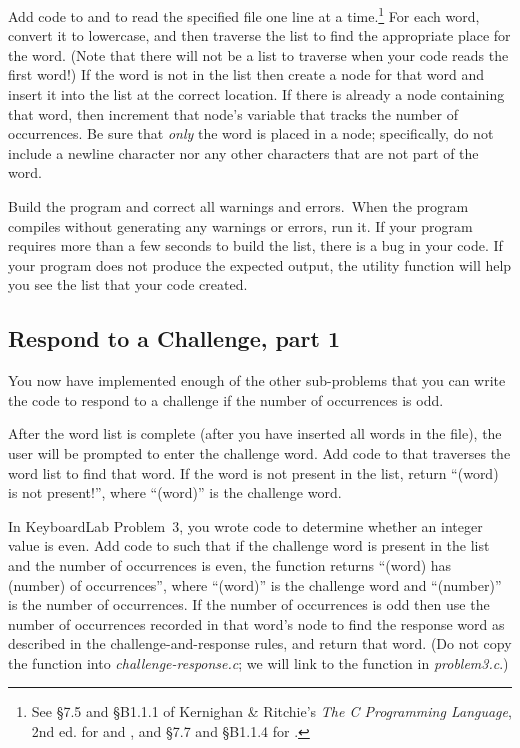 

Add code to  and  to read the specified file one line at a time.\footnote{See \S7.5 and \S{}B1.1.1 of Kernighan \& Ritchie's \textit{The C Programming Language}, 2nd ed. for  and , and \S7.7 and \S{}B1.1.4 for .} For each word, convert it to lowercase, and then traverse the list to find the appropriate place for the word.
(Note that there will not be a list to traverse when your code reads the first word!)
If the word is not in the list then create a node for that word and insert it into the list at the correct location.
If there is already a node containing that word, then increment that node's variable that tracks the number of occurrences.
Be sure that \textit{only} the word is placed in a node;
specifically, do not include a newline character nor any other characters that are not part of the word.

Build the program and correct all warnings and errors.\ When the program compiles without generating any warnings or errors, run it.
If your program requires more than a few seconds to build the list, there is a bug in your code.
If your program does not produce the expected output, the  utility function will help you see the list that your code created.

\subsection{Respond to a Challenge, part 1}

You now have implemented enough of the other sub-problems that you can write the code to respond to a challenge if the number of occurrences is odd.



After the word list is complete (after you have inserted all words in the file), the user will be prompted to enter the challenge word.
Add code to  that traverses the word list to find that word.
If the word is not present in the list, return ``(word) is not present!'', where ``(word)'' is the challenge word.

In KeyboardLab Problem~3, you wrote code to determine whether an integer value is even.
Add code to  such that if the challenge word is present in the list and the number of occurrences is even, the function returns ``(word) has (number) of occurrences'', where ``(word)'' is the challenge word and ``(number)'' is the number of occurrences.
If the number of occurrences is odd then use the number of occurrences recorded in that word's node to find the response word as described in the challenge-and-response rules, and return that word. (Do not copy the  function into \textit{challenge-response.c}; we will link to the function in \textit{problem3.c}.)

